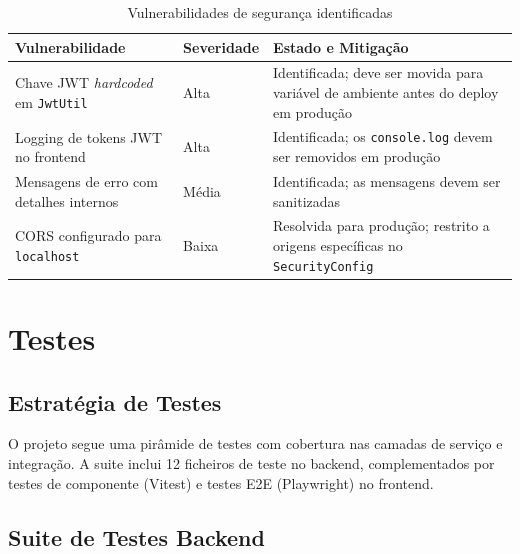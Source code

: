 \documentclass[12pt, a4paper]{report}
\begin{document}
\begin{table}[H]
  \centering
  \begin{tabularx}{\textwidth}{L{5cm} L{2cm} X}
    \toprule
    \textbf{Vulnerabilidade} & \textbf{Severidade} & \textbf{Estado e Mitigação} \\
    \midrule
    Chave JWT \emph{hardcoded} em \texttt{JwtUtil} & Alta & Identificada; deve ser movida para variável de ambiente antes do deploy em produção \\
    Logging de tokens JWT no frontend & Alta & Identificada; os \texttt{console.log} devem ser removidos em produção \\
    Mensagens de erro com detalhes internos & Média & Identificada; as mensagens devem ser sanitizadas \\
    CORS configurado para \texttt{localhost} & Baixa & Resolvida para produção; restrito a origens específicas no \texttt{SecurityConfig} \\
    \bottomrule
  \end{tabularx}
  \caption{Vulnerabilidades de segurança identificadas}
\end{table}

\chapter{Testes}
\label{chap:testes}

\section{Estratégia de Testes}

O projeto segue uma pirâmide de testes com cobertura nas camadas de serviço e
integração. A suite inclui 12 ficheiros de teste no backend, complementados por
testes de componente (Vitest) e testes E2E (Playwright) no frontend.

\section{Suite de Testes Backend}
\end{document}
